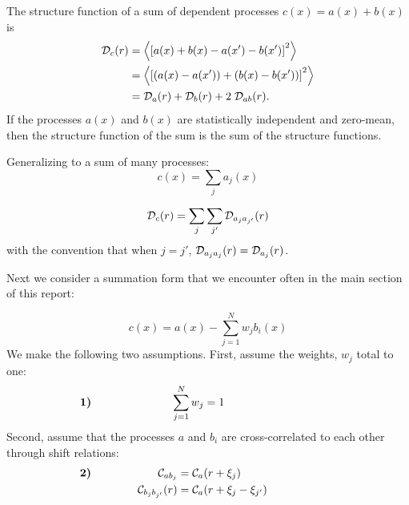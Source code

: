 \documentclass[11pt, oneside]{article}   	%
\begin{document}
\begin{appendix}
\vspace{12pt}

The structure function of a sum of dependent processes $c(x) = a(x) + b(x)$ is
\begin{align}
\label{eqn:strucSum}
{\cal D}_c (r) &= \left< \left [ a(x) + b(x) - a(x') - b(x') \right]^2 \right> \nonumber \\
                         &= \left< \left [ (a(x) - a(x')) + (b(x)-b(x')) \right]^2 \right> \nonumber \\
                         &= {\cal D}_a (r) + {\cal D}_b (r) + 2\; {\cal D}_{a b} (r).
\end{align}
If the processes $a(x)$ and $b(x)$ are statistically independent and zero-mean, then the structure function of the sum is the sum of the structure functions.

Generalizing to a sum of many processes:
\begin{equation}
c(x) = \sum_j a_j(x)
\end{equation}

\begin{equation}
\label{eqn:manySumRule}
{\cal D}_c(r) = \sum_j \sum_{j'} {\cal D}_{a_j a_{j'}} (r)
\end{equation}
with the convention that when $j=j'$, ${\cal D}_{a_j a_j}(r) = {\cal D}_{a_j}(r)$.

Next we consider a summation form that we encounter often in the main section of this report:

\begin{equation}
\label{eqn:A1_residualSum}
c(x) = a(x) - \sum_{j=1}^N w_j b_i(x)
\end{equation}
We make the following two assumptions. First, assume the weights, $w_j$ total to one:
\begin{equation}
\text{\bf  1)}\hspace{2.5cm} \sum_{j=1}^N w_j = 1  \hspace{3.5cm}
\end {equation}
Second, assume that the processes $a$ and $b_i$ are cross-correlated to each other through shift relations:
\begin{align}
\text{\bf  2)}\hspace{.1cm} \hspace{2.0cm} {\cal C}_{a b_j} &= {\cal C}_a(r+\xi_j) \hspace{3.0cm} \nonumber \\
{\cal C}_{b_j b_{j'}}(r) &= {\cal C}_a(r+\xi_j - \xi_{j'}) 
\end{align}


\end{appendix}
\end{document}
